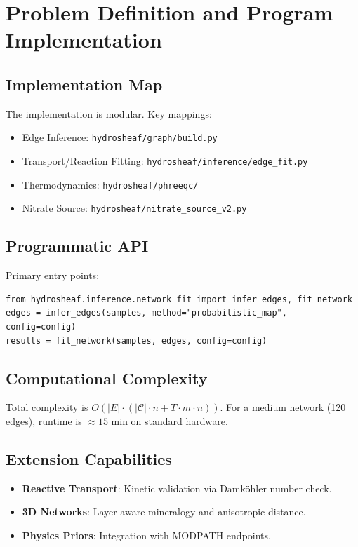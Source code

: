 \documentclass[12pt,a4paper]{article}
\theoremstyle{plain}
\theoremstyle{definition}
\theoremstyle{remark}
\begin{document}
\newpage

\section{Problem Definition and Program Implementation}\label{sec:implementation}

\subsection{Implementation Map}\label{sec:impl_map}
The implementation is modular. Key mappings:
\begin{itemize}
	\item Edge Inference: \texttt{hydrosheaf/graph/build.py}
	\item Transport/Reaction Fitting: \texttt{hydrosheaf/inference/edge\_fit.py}
	\item Thermodynamics: \texttt{hydrosheaf/phreeqc/}
	\item Nitrate Source: \texttt{hydrosheaf/nitrate\_source\_v2.py}
\end{itemize}

\subsection{Programmatic API}\label{sec:api}
Primary entry points:
\begin{verbatim}
from hydrosheaf.inference.network_fit import infer_edges, fit_network
edges = infer_edges(samples, method="probabilistic_map", config=config)
results = fit_network(samples, edges, config=config)
\end{verbatim}

\subsection{Computational Complexity}\label{sec:complexity}
Total complexity is $O(|E| \cdot (|\mathcal{C}| \cdot n + T \cdot m \cdot n))$. For a medium network (120 edges), runtime is $\approx 15$ min on standard hardware.

\subsection{Extension Capabilities}\label{sec:extensions}
\begin{itemize}
	\item \textbf{Reactive Transport}: Kinetic validation via Damköhler number check.
	\item \textbf{3D Networks}: Layer-aware mineralogy and anisotropic distance.
	\item \textbf{Physics Priors}: Integration with MODPATH endpoints.
\end{itemize}
\end{document}
